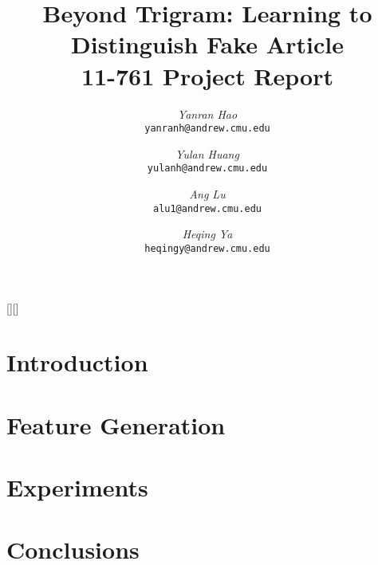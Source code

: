 \documentclass[12pt,twocolumn]{article}
\begin{document}
[][\FBwidth]
\newcommand{\beq}{\begin{equation}}
\newcommand{\eeq}{\end{equation}}
\newcommand{\bit}{\begin{itemize*}}
\newcommand{\eit}{\end{itemize*}}
\newcommand{\goal}[1]{ {\noindent {$\Rightarrow$} \em {#1} } }
\newcommand{\hide}[1]{}
\newcommand{\comment}[1]{ {\footnotesize {#1} } }
\newtheorem{lemma}{Lemma}
\newtheorem{theorem}{Theorem}
\newtheorem{proof}{Proof}
\newtheorem{defn}{Definition}
\newtheorem{algo}{Algorithm}
\newtheorem{observation}{Observation}

\title{Beyond Trigram: Learning to Distinguish Fake Article\\11-761 Project Report}


\author{ 
	{\em Yanran Hao} \\
	    {\tt yanranh@andrew.cmu.edu}
	 \and
	 {\em Yulan Huang} \\
	    {\tt yulanh@andrew.cmu.edu}
	  \and  
	{\em Ang Lu} \\
	    {\tt alu1@andrew.cmu.edu}
	 \and
	 {\em Heqing Ya} \\
	     {\tt heqingy@andrew.cmu.edu}
        }


\maketitle
%    

\section{Introduction}
    \label{sec:intro}
    

\section{Feature Generation}
    \label{sec:feature}
    
    
%   


\section{Experiments}
    \label{sec:experiments}
    

\section{Conclusions}
    \label{sec:conclusions}
    
\clearpage



%

\end{document}
